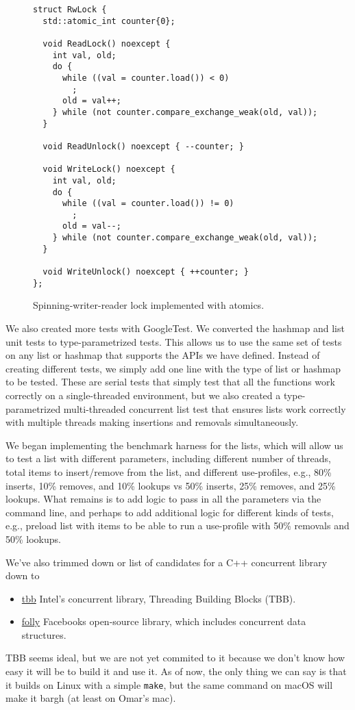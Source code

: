 \documentclass[11pt]{article}
\begin{document}
\begin{figure}
\begin{center}
\begin{lstlisting}
struct RwLock {
  std::atomic_int counter{0};

  void ReadLock() noexcept {
    int val, old;
    do {
      while ((val = counter.load()) < 0)
        ;
      old = val++;
    } while (not counter.compare_exchange_weak(old, val));
  }

  void ReadUnlock() noexcept { --counter; }

  void WriteLock() noexcept {
    int val, old;
    do {
      while ((val = counter.load()) != 0)
        ;
      old = val--;
    } while (not counter.compare_exchange_weak(old, val));
  }

  void WriteUnlock() noexcept { ++counter; }
};
\end{lstlisting}
\caption{Spinning-writer-reader lock implemented with atomics.}
\label{fig:rwlock}
\end{center}
\end{figure}

We also created more tests with GoogleTest. We converted the hashmap and list
unit tests to type-parametrized tests. This allows us to use the same set of
tests on any list or hashmap that supports the APIs we have defined. Instead of
creating different tests, we simply add one line with the type of list or
hashmap to be tested. These are serial tests that simply test that all the
functions work correctly on a single-threaded environment, but we also created a
type-parametrized multi-threaded concurrent list test that ensures lists work
correctly with multiple threads making insertions and removals simultaneously.

We began implementing the benchmark harness for the lists, which will allow us
to test a list with different parameters, including different number of threads,
total items to insert/remove from the list, and different use-profiles, e.g.,
80\% inserts, 10\% removes, and 10\% lookups vs 50\% inserts, 25\% removes, and
25\% lookups. What remains is to add logic to pass in all the parameters via the
command line, and perhaps to add additional logic for different kinds of tests,
e.g., preload list with items to be able to run a use-profile with 50\% removals
and 50\% lookups.


We've also trimmed down or list of candidates for a C++ concurrent library down
to
\begin{itemize}
\item
\href{https://github.com/01org/tbb}{tbb} Intel's concurrent library, Threading
Building Blocks (TBB).
\item
\href{https://github.com/facebook/folly}{folly} Facebooks open-source library,
which includes concurrent data structures.
\end{itemize}
TBB seems ideal, but we are not yet commited to it because we don't know how easy
it will be to build it and use it. As of now, the only thing we can say is that it
builds on Linux with a simple {\tt make}, but the same command on macOS will make
it bargh (at least on Omar's mac).
\end{document}
